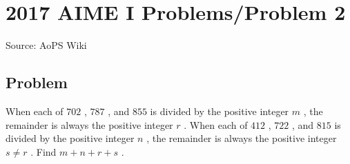 \documentclass[12pt]{article}
\begin{document}
\section*{{2017 AIME I Problems/Problem 2}}
Source: AoPS Wiki

\subsection*{Problem}
When each of $702$ , $787$ , and $855$ is divided by the positive integer $m$ , the remainder is always the positive integer $r$ . When each of $412$ , $722$ , and $815$ is divided by the positive integer $n$ , the remainder is always the positive integer $s \neq r$ . Find $m+n+r+s$ .
\end{document}
